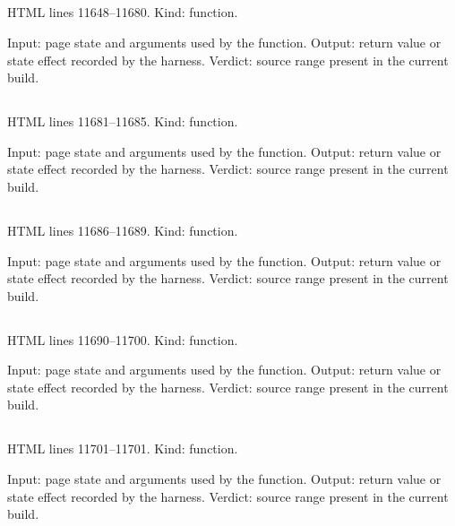 \subsection*{\texttt{}}
\label{vf_652_astRender}
HTML lines 11648--11680. Kind: function.

Input: page state and arguments used by the function.
Output: return value or state effect recorded by the harness.
Verdict: source range present in the current build.

\subsection*{\texttt{}}
\label{vf_653_astCount}
HTML lines 11681--11685. Kind: function.

Input: page state and arguments used by the function.
Output: return value or state effect recorded by the harness.
Verdict: source range present in the current build.

\subsection*{\texttt{}}
\label{vf_654_astOutput}
HTML lines 11686--11689. Kind: function.

Input: page state and arguments used by the function.
Output: return value or state effect recorded by the harness.
Verdict: source range present in the current build.

\subsection*{\texttt{}}
\label{vf_655_astBuild}
HTML lines 11690--11700. Kind: function.

Input: page state and arguments used by the function.
Output: return value or state effect recorded by the harness.
Verdict: source range present in the current build.

\subsection*{\texttt{}}
\label{vf_656_astOpen}
HTML lines 11701--11701. Kind: function.

Input: page state and arguments used by the function.
Output: return value or state effect recorded by the harness.
Verdict: source range present in the current build.

